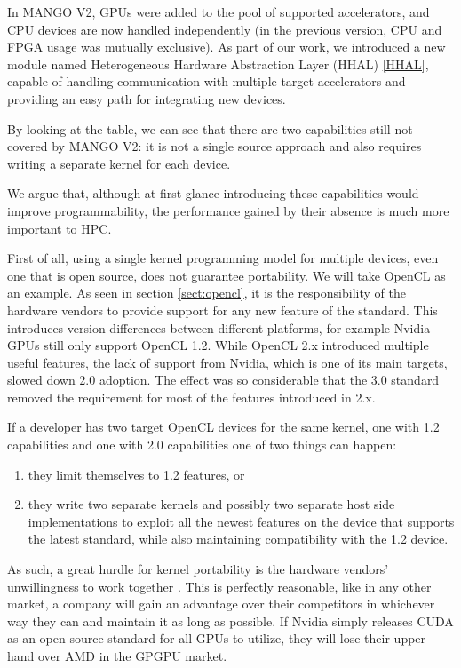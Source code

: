 In MANGO V2, GPUs were added to the pool of supported accelerators, and CPU devices are now handled independently (in the previous version, CPU and FPGA usage was mutually exclusive).
As part of our work, we introduced a new module named Heterogeneous Hardware Abstraction Layer (HHAL) \ref{HHAL}, capable of handling communication with multiple target accelerators and providing an easy path for integrating new devices.

By looking at the table, we can see that there are two capabilities still not covered by MANGO V2: it is not a single source approach and also requires writing a separate kernel for each device.

We argue that, although at first glance introducing these capabilities would improve programmability, the performance gained by their absence is much more important to HPC.

First of all, using a single kernel programming model for multiple devices, even one that is open source, does not guarantee portability. We will take OpenCL as an example. As seen in section \ref{sect:opencl}, it is the responsibility of the hardware vendors to provide support for any new feature of the standard. This introduces version differences between different platforms, for example Nvidia GPUs still only support OpenCL 1.2. While OpenCL 2.x introduced multiple useful features, the lack of support from Nvidia, which is one of its main targets, slowed down 2.0 adoption. The effect was so considerable that the 3.0 standard removed the requirement for most of the features introduced in 2.x. 

If a developer has two target OpenCL devices for the same kernel, one with 1.2 capabilities and one with 2.0 capabilities one of two things can happen: 
\begin{enumerate}
    \item they limit themselves to 1.2 features, or
    \item they write two separate kernels and possibly two separate host side implementations to exploit all the newest features on the device that supports the latest standard, while also maintaining compatibility with the 1.2 device.
\end{enumerate}
 
As such, a great hurdle for kernel portability is the hardware vendors' unwillingness to work together \cite{but_mummy_cuda}. This is perfectly reasonable, like in any other market, a company will gain an advantage over their competitors in whichever way they can and maintain it as long as possible. If Nvidia simply releases CUDA as an open source standard for all GPUs to utilize, they will lose their upper hand over AMD in the GPGPU market.

